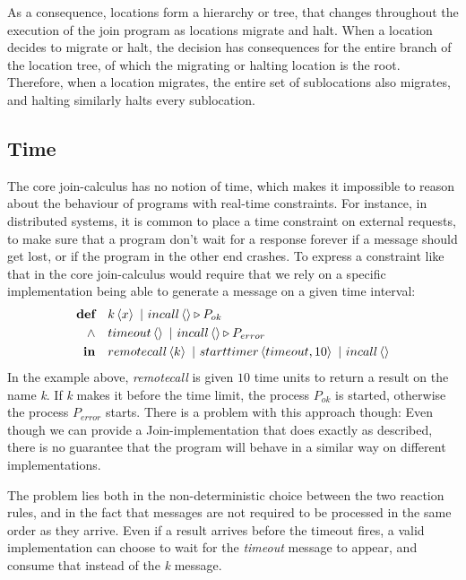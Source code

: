 As a consequence, locations form a hierarchy or tree, that changes throughout
the execution of the join program as locations migrate and halt.
When a location decides to migrate or halt, the decision has consequences for
the entire branch of the location tree, of which the migrating or halting
location is the root. Therefore, when a location migrates, the entire set of
sublocations also migrates, and halting similarly halts every sublocation.


\subsection{Time}

The core join-calculus has no notion of time, which makes it
impossible to reason about the behaviour of programs with real-time
constraints.  For instance, in distributed systems, it is common to
place a time constraint on external requests, to make sure that a
program don't wait for a response forever if a message should get
lost, or if the program in the other end crashes. To express a
constraint like that in the core join-calculus would require that we
rely on a specific implementation being able to generate a message on
a given time interval:
\begin{align*}
  \textbf{def}\quad & \atm k<x> ~|~ \atm incall<> \triangleright P_{ok} \\
  \land\quad & \atm timeout<> ~|~ \atm incall<> \triangleright P_{error} \\
  \textbf{in}\quad & \atm remotecall<k> ~|~ \atm starttimer<timeout, 10>
                                      ~|~ \atm incall<>
\end{align*}
In the example above, \emph{remotecall} is given $10$ time units to
return a result on the name \emph{k}. If \emph{k} makes it before the
time limit, the process $P_{ok}$ is started, otherwise the process
$P_{error}$ starts.  There is a problem with this approach though:
Even though we can provide a Join-implementation that does exactly as
described, there is no guarantee that the program will behave in a
similar way on different implementations.

The problem lies both in the non-deterministic choice between the two
reaction rules, and in the fact that messages are not required to be
processed in the same order as they arrive. Even if a result arrives
before the timeout fires, a valid implementation can choose to wait
for the \emph{timeout} message to appear, and consume that instead of
the \emph{k} message.

